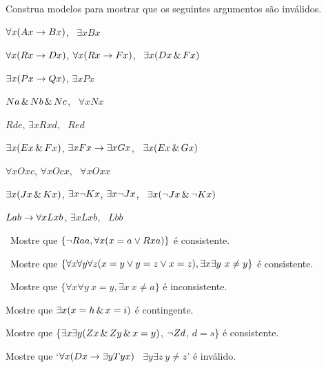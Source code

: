 \problempart
Construa modelos para mostrar que os seguintes argumentos são inválidos.
\begin{earg}
\item $\forall x(Ax \rightarrow Bx)$, \therefore\ $\exists x Bx$
\item $\forall x(Rx \rightarrow Dx)$, $\forall x(Rx \rightarrow Fx)$, \therefore\ $\exists x(Dx \,\&\, Fx)$
\item $\exists x(Px\rightarrow Qx)$, \therefore $\exists x Px$
\item $Na \,\&\, Nb \,\&\, Nc$, \therefore\ $\forall x Nx$
\item $Rde$, $\exists x Rxd$, \therefore\ $Red$
\item $\exists x(Ex \,\&\, Fx)$, $\exists x Fx \rightarrow \exists x Gx$, \therefore\ $\exists x(Ex \,\&\, Gx)$
\item $\forall x Oxc$, $\forall x Ocx$, \therefore\ $\forall x Oxx$
\item $\exists x(Jx \,\&\, Kx)$, $\exists x \neg Kx$, $\exists x \neg Jx$, \therefore\ $\exists x(\neg Jx \,\&\, \neg Kx)$
\item $Lab \rightarrow \forall x Lxb$, $\exists x Lxb$, \therefore\ $Lbb$
\end{earg}

\problempart
\label{pr.IdentityModels}
\begin{earg}
\item\leftsolutions\ Mostre que $\{{\neg}Raa, \forall x (x=a \vee Rxa)\}$
é consistente.
\item\leftsolutions\ Mostre que $\{\forall x\forall y\forall z(x=y \vee y=z \vee x=z),
\exists x\exists y\ x\neq y\}$ é consistente.
\item\leftsolutions\ Mostre que $\{\forall x\forall y\ x=y, \exists x\ x \neq a\}$ é inconsistente.
\item Mostre que $\exists x (x = h \,\&\, x = i)$ é contingente.
\item Mostre que \{$\exists x\exists y(Zx \,\&\, Zy \,\&\, x=y)$, $\neg Zd$, $d=s$\} é consistente.
\item Mostre que `$\forall x(Dx \rightarrow \exists y Tyx)$ \therefore\ $\exists y \exists z\ y\neq z$' é inválido.
\end{earg}

